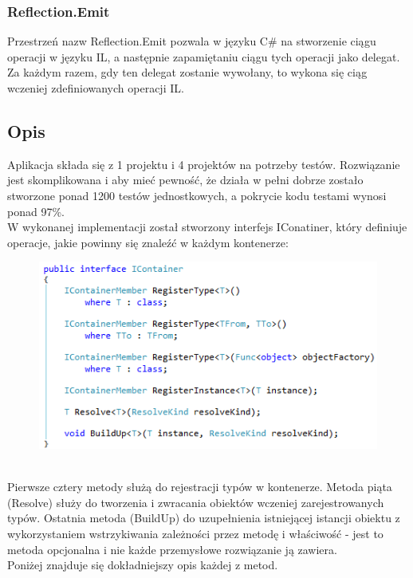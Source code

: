 \documentclass[12pt]{article}
\begin{document}
\subsubsection{Reflection.Emit}
Przestrzeń nazw Reflection.Emit pozwala w języku C\# na stworzenie ciągu operacji w języku IL, a następnie zapamiętaniu ciągu tych operacji jako delegat. Za każdym razem, gdy ten delegat zostanie wywołany, to wykona się ciąg wczeniej zdefiniowanych operacji IL.


\subsection{Opis}
Aplikacja składa się z 1 projektu i 4 projektów na potrzeby testów. Rozwiązanie jest skomplikowana i aby mieć pewność, że działa w pełni dobrze zostało stworzone  ponad 1200 testów jednostkowych, a pokrycie kodu testami wynosi ponad 97\%.\\

W wykonanej implementacji został stworzony interfejs IConatiner, który definiuje operacje, jakie powinny się znaleźć w każdym kontenerze:
\begin{figure}[h]
	\begin{raggedleft}
  		\includegraphics{IContainer.png}
	\end{raggedleft}
\end{figure}\\
Pierwsze cztery metody służą do rejestracji typów w kontenerze. Metoda piąta (Resolve) służy do tworzenia i zwracania obiektów wczeniej zarejestrowanych typów. Ostatnia metoda (BuildUp) do uzupełnienia istniejącej istancji obiektu z wykorzystaniem wstrzykiwania zależności przez metodę i właściwość - jest to metoda opcjonalna i nie każde przemysłowe rozwiązanie ją zawiera.\\
Poniżej znajduje się dokładniejszy opis każdej z metod.
\end{document}
